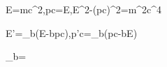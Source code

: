 E=\gamma mc^2,\qquad pc=\beta E,\qquad E^2-(pc)^2=m^2c^4

E'=\gamma_b(E-bpc),\qquad p'c=\gamma_b(pc-bE)

\gamma_b=
